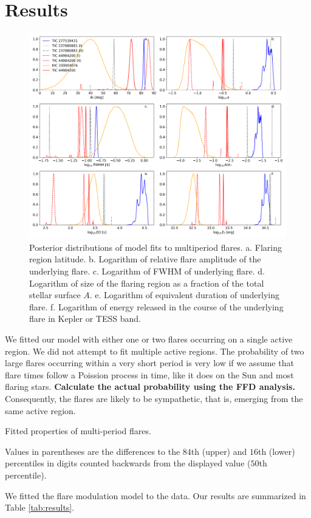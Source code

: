 \documentclass[fleqn,usenatbib,letters]{mnras}%
\begin{document}
\section{Results}
\begin{figure}
	\includegraphics[width=\hsize]{figures/12_08_2020_posteriors.png}
    \caption{Posterior distributions of model fits to multiperiod flares. a. Flaring region latitude. b. Logarithm of relative flare amplitude of the underlying flare. c. Logarithm of FWHM of underlying flare. d. Logarithm of size of the flaring region as a fraction of the total stellar surface $A$. e. Logarithm of equivalent duration of underlying flare. f. Logarithm of energy released in the course of the underlying flare in Kepler or TESS band.} 
    \label{fig:posteriors}
\end{figure}

We fitted our model with either one or two flares occurring on a single active region. We did not attempt to fit multiple active regions. The probability of two large flares occurring within a very short period is very low if we assume that flare times follow a Poission process in time, like it does on the Sun and most flaring stars. \textbf{Calculate the actual probability using the FFD analysis.} Consequently, the flares are likely to be sympathetic, that is, emerging from the same active region.

\label{sec:results}

\begin{table}
\centering
\caption{Fitted properties of multi-period flares.}
\label{tab:stars}

Values in parentheses are the differences to the $84$th (upper) and $16$th (lower) percentiles in digits counted backwards from the displayed value ($50$th percentile).
\end{table}
We fitted the flare modulation model to the data. Our results are summarized in Table \ref{tab:results}.
\end{document}
